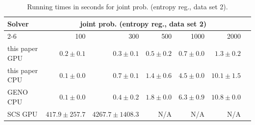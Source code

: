
\begin{table}[h!]
\begin{center}
  \small
  \begin{tabular}{l*{6}{r}}
    \toprule
    \multirow{2}{*}{Solver} & \multicolumn{5}{c}{joint prob. (entropy reg., data set 2)} \\
    \cmidrule{2-6}
    & 100 & 300 & 500 & 1000 & 2000 \\
    \midrule
    this paper GPU & $0.2\pm 0.1$ & $0.3\pm 0.1$ & $0.5\pm 0.2$ & $0.7\pm 0.0$ & $1.3\pm 0.2$ \\
    this paper CPU & $0.1\pm 0.0$ & $0.7\pm 0.1$ & $1.4\pm 0.6$ & $4.5\pm 0.0$ & $10.1\pm 1.5$ \\
    GENO CPU & $0.1\pm 0.0$ & $0.4\pm 0.2$ & $1.8\pm 0.0$ & $6.3\pm 0.9$ & $10.8\pm 0.0$ \\
    SCS GPU & $417.9\pm 257.7$ & $4267.7\pm 1408.3$ & N/A & N/A & N/A \\
    \bottomrule
  \end{tabular}%
  \caption{Running times in seconds for joint prob. (entropy reg., data set 2).}
  \end{center}
\end{table}
